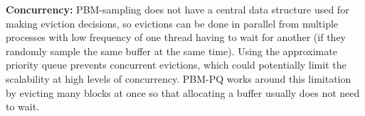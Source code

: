 

\textbf{Concurrency:} PBM-sampling does not have a central data structure used for making eviction decisions, so evictions can be done in parallel from multiple processes with low frequency of one thread having to wait for another (if they randomly sample the same buffer at the same time). Using the approximate priority queue prevents concurrent evictions, which could potentially limit the scalability at high levels of concurrency. PBM-PQ works around this limitation by evicting many blocks at once so that allocating a buffer usually does not need to wait.%



